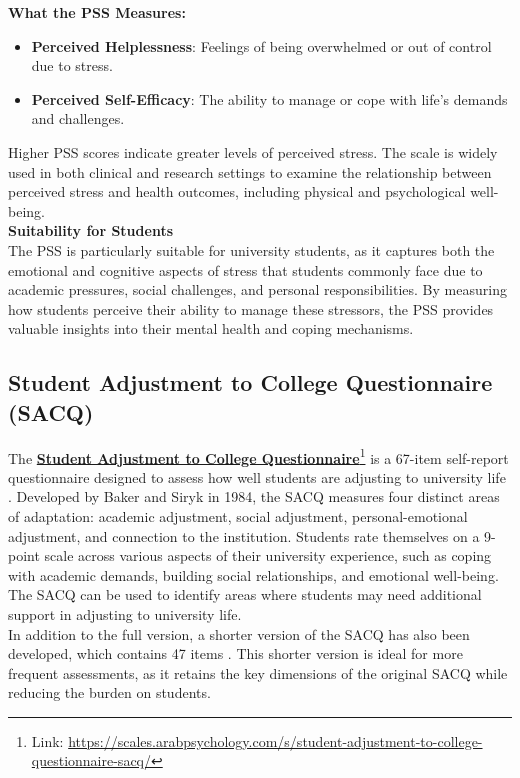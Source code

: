 \noindent \textbf{What the PSS Measures:}
\begin{itemize}
    \item \textbf{Perceived Helplessness}: Feelings of being overwhelmed or out of control due to stress.
    \item \textbf{Perceived Self-Efficacy}: The ability to manage or cope with life’s demands and challenges.
\end{itemize}
Higher PSS scores indicate greater levels of perceived stress. The scale is widely used in both clinical and research settings to examine the relationship between perceived stress and health outcomes, including physical and psychological well-being.\vspace{5mm} \\
\noindent \textbf{Suitability for Students} \\
The PSS is particularly suitable for university students, as it captures both the emotional and cognitive aspects of stress that students commonly face due to academic pressures, social challenges, and personal responsibilities. By measuring how students perceive their ability to manage these stressors, the PSS provides valuable insights into their mental health and coping mechanisms.

\subsection{Student Adjustment to College Questionnaire (SACQ)}

The \textbf{\href{https://scales.arabpsychology.com/s/student-adjustment-to-college-questionnaire-sacq/}{Student Adjustment to College Questionnaire}}\footnote{Link: \url{https://scales.arabpsychology.com/s/student-adjustment-to-college-questionnaire-sacq/}} is a 67-item self-report questionnaire designed to assess how well students are adjusting to university life \cite{sacq-review}. Developed by Baker and Siryk in 1984, the SACQ measures four distinct areas of adaptation: academic adjustment, social adjustment, personal-emotional adjustment, and connection to the institution. Students rate themselves on a 9-point scale across various aspects of their university experience, such as coping with academic demands, building social relationships, and emotional well-being. The SACQ can be used to identify areas where students may need additional support in adjusting to university life.\vspace{5mm} \\
In addition to the full version, a shorter version of the SACQ has also been developed, which contains 47 items \cite{sacq-short-review}. This shorter version is ideal for more frequent assessments, as it retains the key dimensions of the original SACQ while reducing the burden on students.\vspace{5mm}

